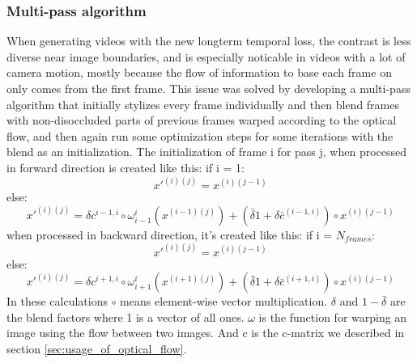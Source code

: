 \subsubsection{Multi-pass algorithm}
When generating videos with the new longterm temporal loss, the contrast is less diverse near image boundaries, and is especially noticable in videos with a lot of camera motion, mostly because the flow of information to base each frame on only comes from the first frame. This issue was solved by developing a multi-pass algorithm that initially stylizes every frame individually and then blend frames with non-disoccluded parts of previous frames warped according to the optical flow, and then again run some optimization steps for some iterations with the blend as an initialization.\newline
The initialization of frame i for pass j, when processed in forward direction is created like this:\newline
if i = 1: 
\begin{equation}
x'^{(i)(j)} = x^{(i)(j-1)}
\end{equation}
else:
\begin{equation}
x'^{(i)(j)} = \delta c^{i-1, i} \circ \omega_{i-1}^i(x^{(i-1)(j)}) + (\bar{\delta}1 + \delta \bar{c}^{(i-1, i)})\circ x^{(i)(j-1)}
\end{equation}\newline
when processed in backward direction, it's created like this:\newline
if i = $N_{frames}$:\newline
\begin{equation}
x'^{(i)(j)} = x^{(i)(j-1)}
\end{equation}
else:\newline
\begin{equation}
x'^{(i)(j)} = \delta c^{i+1, i} \circ \omega_{i+1}^i(x^{(i+1)(j)}) + (\bar{\delta}1 + \delta \bar{c}^{(i+1, i)})\circ x^{(i)(j-1)}
\end{equation} \newline
In these calculations $\circ$ means element-wise vector multiplication. $\delta$ and $1 -\bar{\delta}$ are the blend factors where 1 is a vector of all ones. $\omega$ is the function for warping an image using the flow between two images. And c is the c-matrix we described in section \ref{sec:usage_of_optical_flow}.
